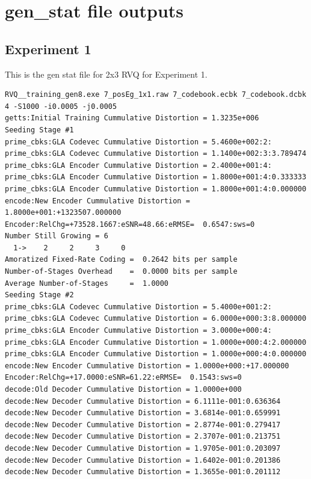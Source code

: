 \appendix
\clearpage
\newpage
\section{gen\_stat file outputs}

\subsection{Experiment 1}
\label{Exp1_gen_stat}
This is the gen stat file for 2x3 RVQ for Experiment 1.

\scriptsize
\begin{verbatim}
RVQ__training_gen8.exe 7_posEg_1x1.raw 7_codebook.ecbk 7_codebook.dcbk 4 -S1000 -i0.0005 -j0.0005 
getts:Initial Training Cummulative Distortion = 1.3235e+006
Seeding Stage #1
prime_cbks:GLA Codevec Cummulative Distortion = 5.4600e+002:2:
prime_cbks:GLA Codevec Cummulative Distortion = 1.1400e+002:3:3.789474
prime_cbks:GLA Encoder Cummulative Distortion = 2.4000e+001:4:
prime_cbks:GLA Encoder Cummulative Distortion = 1.8000e+001:4:0.333333
prime_cbks:GLA Encoder Cummulative Distortion = 1.8000e+001:4:0.000000
encode:New Encoder Cummulative Distortion = 1.8000e+001:+1323507.000000
Encoder:RelChg=+73528.1667:eSNR=48.66:eRMSE=  0.6547:sws=0
Number Still Growing = 6
  1->    2     2     3     0 
Amoratized Fixed-Rate Coding =  0.2642 bits per sample
Number-of-Stages Overhead    =  0.0000 bits per sample
Average Number-of-Stages     =  1.0000
Seeding Stage #2
prime_cbks:GLA Codevec Cummulative Distortion = 5.4000e+001:2:
prime_cbks:GLA Codevec Cummulative Distortion = 6.0000e+000:3:8.000000
prime_cbks:GLA Encoder Cummulative Distortion = 3.0000e+000:4:
prime_cbks:GLA Encoder Cummulative Distortion = 1.0000e+000:4:2.000000
prime_cbks:GLA Encoder Cummulative Distortion = 1.0000e+000:4:0.000000
encode:New Encoder Cummulative Distortion = 1.0000e+000:+17.000000
Encoder:RelChg=+17.0000:eSNR=61.22:eRMSE=  0.1543:sws=0
decode:Old Decoder Cummulative Distortion = 1.0000e+000
decode:New Decoder Cummulative Distortion = 6.1111e-001:0.636364
decode:New Decoder Cummulative Distortion = 3.6814e-001:0.659991
decode:New Decoder Cummulative Distortion = 2.8774e-001:0.279417
decode:New Decoder Cummulative Distortion = 2.3707e-001:0.213751
decode:New Decoder Cummulative Distortion = 1.9705e-001:0.203097
decode:New Decoder Cummulative Distortion = 1.6402e-001:0.201386
decode:New Decoder Cummulative Distortion = 1.3655e-001:0.201112

\end{verbatim}
